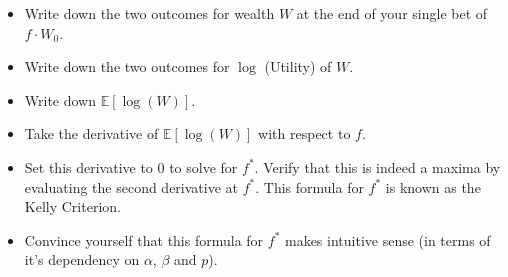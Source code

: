 \documentclass[12pt]{exam}
\begin{document}
\begin{questions}
\begin{itemize}
\item Write down the two outcomes for wealth $W$ at the end of your single bet of $f \cdot W_0$.
\item Write down the two outcomes for $\log$ (Utility) of $W$.
\item Write down $\mathbb{E}[\log(W)]$.
\item Take the derivative of $\mathbb{E}[\log(W)]$ with respect to $f$. 
\item Set this derivative to 0 to solve for $f^*$. Verify that this is indeed a maxima by evaluating the second derivative at $f^*$. This formula for $f^*$ is known as the Kelly Criterion. 
\item Convince yourself that this formula for $f^*$ makes intuitive sense (in terms of it's dependency on $\alpha$, $\beta$ and $p$).
\end{itemize}


\end{questions}
\end{document}
